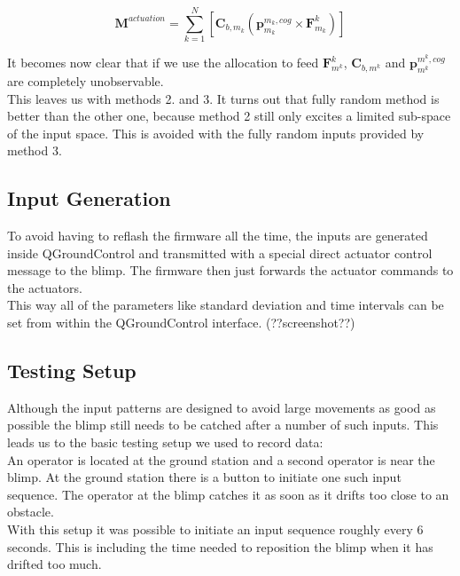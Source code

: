 \begin{equation}
\label{eq:m_actuation}
\mathbf{M}^{actuation} = \sum_{k=1}^N  \left[  \mathbf{C}_{b,m_k} \left( \mathbf{p}^{m_k,cog}_{m_k} \times \mathbf{F}^k_{m_k} \right)  \right]
\end{equation}

It becomes now clear that if we use the allocation to feed $\mathbf{F}^k_{m^k}$, $\mathbf{C}_{b,m^k}$ and $\mathbf{p}^{m^k,cog}_{m^k}$ are completely unobservable.\\
This leaves us with methods 2. and 3.
It turns out that fully random method is better than the other one, because method 2 still only excites a limited sub-space of the input space. This is avoided with the fully random inputs provided by method 3.\\

\subsection{Input Generation}
\label{sub:input_generation}
To avoid having to reflash the firmware all the time, the inputs are generated inside QGroundControl and transmitted with a special direct actuator control message to the blimp.
The firmware then just forwards the actuator commands to the actuators. \\
This way all of the parameters like standard deviation and time intervals can be set from within the QGroundControl interface. (??screenshot??)\\

\subsection{Testing Setup}
\label{sub:testing_setup}
Although the input patterns are designed to avoid large movements as good as possible the blimp still needs to be catched after a number of such inputs. This leads us to the basic testing setup we used to record data: \\
An operator is located at the ground station and a second operator is near the blimp.
At the ground station there is a button to initiate one such input sequence.
The operator at the blimp catches it as soon as it drifts too close to an obstacle. \\
With this setup it was possible to initiate an input sequence roughly every 6 seconds. 
This is including the time needed to reposition the blimp when it has drifted too much.

